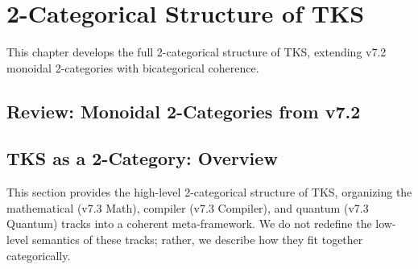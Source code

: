 
\chapter{2-Categorical Structure of TKS}
\label{ch:2-categorical-structure}

\begin{tcolorbox}[colback=blue!5!white,colframe=blue!75!black,title=\vnewthree]
This chapter develops the full 2-categorical structure of TKS, extending v7.2 monoidal 2-categories with bicategorical coherence.
\end{tcolorbox}

\section{Review: Monoidal 2-Categories from v7.2}
\label{sec:review-monoidal-2cat}

\section{TKS as a 2-Category: Overview}
\label{sec:2cat-tks}

\begin{tcolorbox}[colback=green!5!white,colframe=green!75!black,title=\textbf{Meta-Unification Scope}]
This section provides the high-level 2-categorical structure of TKS, organizing the
mathematical (v7.3 Math), compiler (v7.3 Compiler), and quantum (v7.3 Quantum) tracks
into a coherent meta-framework. We do not redefine the low-level semantics of these
tracks; rather, we describe how they fit together categorically.
\end{tcolorbox}


